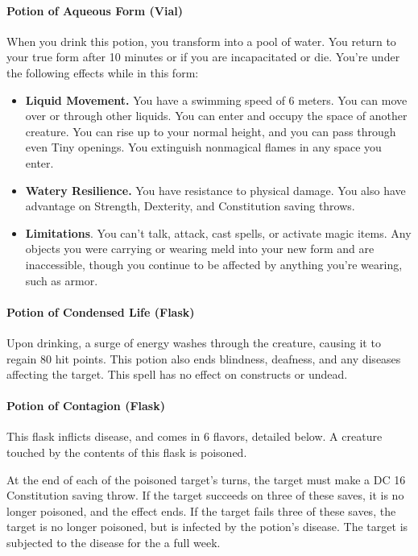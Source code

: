    \paragraph{Potion of Aqueous Form (Vial)}
        When you drink this potion, you transform into a pool of water.
        You return to your true form after 10 minutes or if you are incapacitated or die.
        You're under the following effects while in this form:
        \begin{itemize}
            \item \textbf{Liquid Movement.} You have a swimming speed of 6 meters.
            You can move over or through other liquids.
            You can enter and occupy the space of another creature.
            You can rise up to your normal height, and you can pass through even Tiny openings.
            You extinguish nonmagical flames in any space you enter.
            \item \textbf{Watery Resilience.} You have resistance to physical damage.
            You also have advantage on Strength, Dexterity, and Constitution saving throws.
            \item \textbf{Limitations}. You can't talk, attack, cast spells, or activate magic items.
            Any objects you were carrying or wearing meld into your new form and are inaccessible, though you continue to be affected by anything you're wearing, such as armor.
        \end{itemize}
    \paragraph{Potion of Condensed Life (Flask)} %
        Upon drinking, a surge of energy washes through the creature, causing it to regain 80 hit points.
        This potion also ends blindness, deafness, and any diseases affecting the target.
        This spell has no effect on constructs or undead.
    \paragraph{Potion of Contagion (Flask)} %
        This flask inflicts disease, and comes in 6 flavors, detailed below.
        A creature touched by the contents of this flask is poisoned.

        At the end of each of the poisoned target's turns, the target must make a DC 16 Constitution saving throw.
        If the target succeeds on three of these saves, it is no longer poisoned, and the effect ends.
        If the target fails three of these saves, the target is no longer poisoned, but is infected by the potion's disease.
        The target is subjected to the disease for the a full week.


